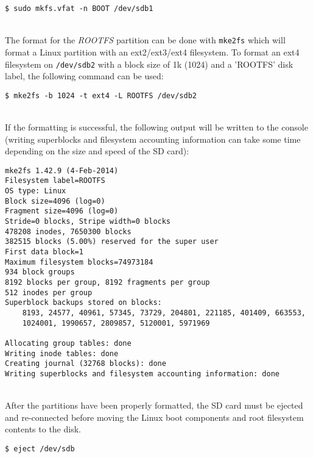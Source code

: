 \begin{lstlisting}
$ sudo mkfs.vfat -n BOOT /dev/sdb1
\end{lstlisting}

~\\
\noindent
The format for the \textit{ROOTFS} partition can be done with \texttt{mke2fs} which will format a Linux partition with an ext2/ext3/ext4 filesystem. To format an ext4 filesystem on \texttt{/dev/sdb2} with a block size of 1k (1024) and a 'ROOTFS' disk label, the following command can be used: \\


\begin{lstlisting}
$ mke2fs -b 1024 -t ext4 -L ROOTFS /dev/sdb2
\end{lstlisting}


~\\
\noindent
If the formatting is successful, the following output will be written to the console (writing superblocks and filesystem accounting information can take some time depending on the size and speed of the SD card): \\

\begin{lstlisting}[style=text]
mke2fs 1.42.9 (4-Feb-2014)
Filesystem label=ROOTFS
OS type: Linux
Block size=4096 (log=0)
Fragment size=4096 (log=0)
Stride=0 blocks, Stripe width=0 blocks
478208 inodes, 7650300 blocks
382515 blocks (5.00%) reserved for the super user
First data block=1
Maximum filesystem blocks=74973184
934 block groups
8192 blocks per group, 8192 fragments per group
512 inodes per group
Superblock backups stored on blocks: 
	8193, 24577, 40961, 57345, 73729, 204801, 221185, 401409, 663553, 
	1024001, 1990657, 2809857, 5120001, 5971969

Allocating group tables: done                            
Writing inode tables: done                            
Creating journal (32768 blocks): done
Writing superblocks and filesystem accounting information: done   
\end{lstlisting}


~\\
\noindent
After the partitions have been properly formatted, the SD card must be ejected and re-connected before moving the Linux boot components and root filesystem contents to the disk. \\

\begin{lstlisting}
$ eject /dev/sdb
\end{lstlisting}


